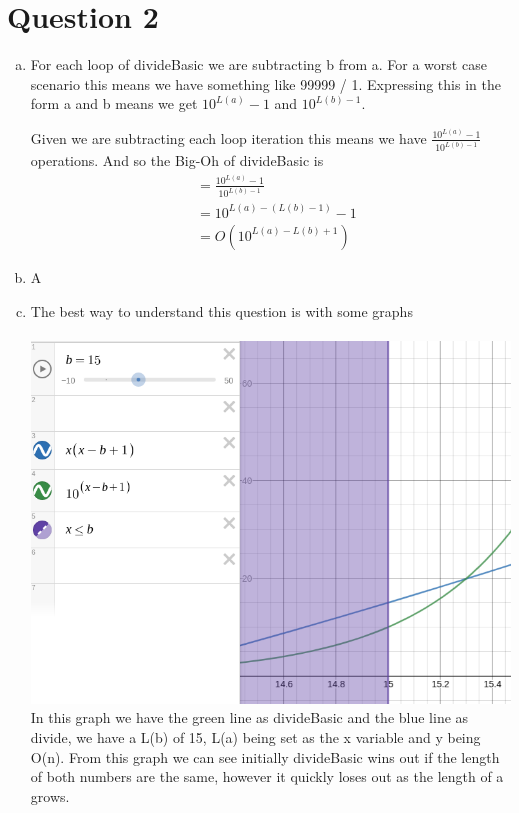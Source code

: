 \documentclass[journal,a4paper]{article}
\begin{document}
\section*{Question 2}
\begin{enumerate}[(a)]
	\item For each loop of divideBasic we are subtracting b from a. For a worst case scenario this means we have something like 99999 / 1. Expressing this in the form a and b means we get $10^{L(a)}-1$ and $10^{L(b)-1}$. 

Given we are subtracting each loop iteration this means we have $\frac{10^{L(a)}-1}{10^{L(b)-1}}$ operations. And so the Big-Oh of divideBasic is 
	\begin{align*}
		&= \frac{10^{L(a)}-1}{10^{L(b)-1}} \\
		&= 10^{L(a)-(L(b)-1)} - 1 \\
		&= O(10^{L(a)-L(b)+1})
	\end{align*}
	\item A
	\item The best way to understand this question is with some graphs
	\\\\
	\includegraphics[scale=2]{divide-complexity-1} \\
	In this graph we have the green line as divideBasic and the blue line as divide, we have a L(b) of 15, L(a) being set as the x variable and y being O(n). From this graph we can see initially divideBasic wins out if the length of both numbers are the same, however it quickly loses out as the length of a grows.
	\\\\

\end{enumerate}
\end{document}
